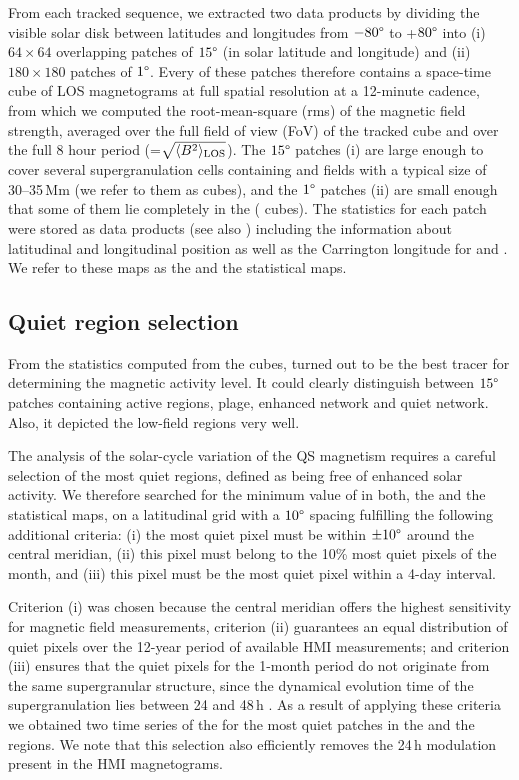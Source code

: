 \documentclass{aa}
\begin{document}
From each tracked sequence, we extracted two data products by dividing the visible solar disk  between latitudes and longitudes from $-80\degree$ to +$80\degree$ into (i) $64\times 64$  overlapping patches of $15\degree$ (in solar latitude and longitude)  and (ii) $180\times 180$ patches of $1\degree$.
Every of these patches therefore contains a space-time cube of LOS magnetograms at full spatial resolution at a 12-minute cadence,
from which we 
computed the 
root-mean-square
(rms) 
of the magnetic field strength, averaged over the full field of view (FoV) of the tracked cube 
and over the full 8 hour period
(\brms{}=$\sqrt{\langle B^2\rangle_{\rm LOS}}$).
The $15\degree$ patches (i) are large enough to cover several supergranulation cells containing \NW{} and \IN{} fields \cite[]{2010LRSP....7....2R} with a typical size of 30--35\,Mm (we refer to them as \nw{} cubes), and the $1\degree$ patches (ii) are small enough that some of them lie completely in the \IN{} (\inw{} cubes). 
The statistics for each patch were stored as data products (see also ) including the information about 
latitudinal and longitudinal position as well as the Carrington 
longitude for \NW{} and \IN{}. We refer to these maps as the \nw{} and the \inw{} statistical maps.

\subsection{Quiet region selection\label{quietregion}}

From the 
statistics computed from the cubes, 
\brms{}
turned out to be the best tracer for determining the magnetic activity level. It could clearly distinguish between $15\degree$ patches containing active regions, plage, enhanced network and quiet network. Also, it depicted
the low-field \IN{} regions very well.

The analysis of the solar-cycle variation of the 
QS
magnetism requires a careful selection of the most quiet regions, defined as being free of enhanced solar activity. We therefore searched for the minimum value of \brms{} in both, the \nw{} and the \inw{} statistical maps, on a latitudinal grid with a $10\degree$ spacing fulfilling the following additional criteria:
(i) the most quiet pixel must be within $\pm10\degree$ around the central meridian,
(ii) this pixel must belong to the 10\% most quiet pixels of the month, and
(iii) this pixel must be the most quiet pixel within a 4-day interval.

Criterion 
(i) was chosen 
because the central meridian offers the highest sensitivity for magnetic field measurements,
criterion
(ii) guarantees an equal distribution of quiet pixels over the 12-year period of available HMI measurements; and 
criterion
(iii) ensures that the quiet pixels for the 1-month period do not originate from the same supergranular structure, since the dynamical evolution time of the supergranulation lies between 24 and 48\,h \cite[]{2010LRSP....7....2R}. 
As a result of applying these criteria we obtained
two time series of the \brms{} for the most quiet patches in the \NW{} and the \IN{} regions. 
We note that this selection also efficiently removes the 24\,h modulation present in the HMI magnetograms.
\end{document}
